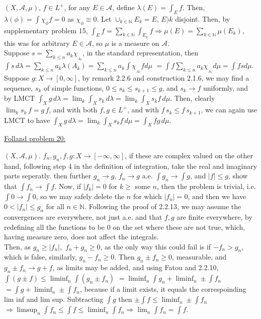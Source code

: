 \documentclass[12pt]{article}
\newcommand{\nats}[0] { \mathbb{N}}
\newcommand{\rimply}[0] { \Rightarrow }
\begin{document}
\begin{flushleft}
$(X,\mathcal A, \mu )$, $f \in L^+$, for  any $E \in \mathcal A$, define $\lambda (E) = \int_E f$. Then, $\lambda(\phi) = \int \chi_\phi f = 0$ as $\chi_\phi \equiv 0$. Let $\cup_{k \in \nats} E_k = E$, $E)k$ disjoint. Then, by supplementary problem 15, $\int_E f = \sum_{k \in \nats} \int_{E_k} f \rimply $$ \mu(E) = \sum_{k \in \nats} \mu(E_k)$, this was for arbitrary $E \in \mathcal A$, so $\mu$ is a measure on $\mathcal A$.\\
Suppose $s = \sum_{k \le n} a_k \chi_{_{A_k}}$, in the standard representation, then $\int s \, d\lambda =  \sum_{k \le n} a_k \lambda(A_k) =    \sum_{k \le n} a_k \int \chi_{_{A_k}} f d\mu $ 
$ = \int f \sum_{k \le n} a_k \chi_{_{A_k}} d\mu = \int f s d\mu$.\\
Suppose $g:X \rightarrow [0, \infty]$, by remark 2.2.6 and construction 2.1.6, we may find a sequence, $s_k$ of simple functions, $0 \le s_k \le s_{k+1} \le g$, and $s_k \rightarrow f$ uniformly, and by LMCT $\int_X g \, d \lambda = \lim_k \int_X s_k \, d \lambda = \lim_k \int_X s_k f \, d \mu $. Then, clearly $\lim_k s_k\, f = g \, f$, and with both $f,g \in L^+$, and with $f \, s_k \le f \, s_{k+1}$, we can again use LMCT to have $\int_X g \, d \lambda = \lim_k \int_X s_k f \, d \mu = \int_X f g \, d\mu$.
\end{flushleft}



\begin{flushleft}
\underline{Folland problem 20:}
\end{flushleft}

\begin{flushleft}
$(X,\mathcal A, \mu )$.  $f_n,g_n,f,g:X \rightarrow [-\infty,\infty]$, if these are complex valued on the other hand, following step 4 in the definition of integration, take the real and imaginary parts seperatly. then further $g_n \rightarrow g$, $f_n \rightarrow g$ a.e. $\int g_n \rightarrow \int g$, and $|f| \le g$, show that $\int f_n \rightarrow \int f$. Now, if $|f_k| = 0$ for $k \ge$ some $n$, then the problem is trivial, i.e. $\int 0 \rightarrow \int 0$, so we may safely delete the $n$ for which $|f_n| = 0$, and then we have $0 < |f_n| \le g_n$ for all $n \in \nats$. Following the proof of 2.2.13, we may assume the convergences are everywhere, not just a.e. and that $f,g$ are finite everywhere, by redefining all the functions to be $0$ on the set where these are not true, which, having measure zero, does not affect the integrals. \\
Then, as $g_n \ge |f_n|,$ $f_n + g_n \ge 0$, as the only way this could fail is if $-f_n > g_n$, which is false, similarly, $ g_n - f_n \ge 0$. Then $g_n \pm f_n \ge 0$, measurable, and $g_n \pm f_n \rightarrow g+f$, as limits may be added, and using Fatou and 2.2.10, $ \int (g \pm f) \le \liminf_n \int (g_n \pm f_n)$ $ =\liminf_n \int g_n +\liminf_n \pm  \int f_n$ $= \int g + \liminf_n \pm \int f_n$, because if a limit exists, it equals the correspoinding lim inf and lim sup. Subtracting $\int g$ then   $\pm \int f \le  \liminf_n  \pm  \int f_n$ $\rimply \limsup_n \int f_n \le \int f \le  \liminf_n \int f_n \rimply \lim_n \int f_n = \int f$.
\end{flushleft}
\end{document}
